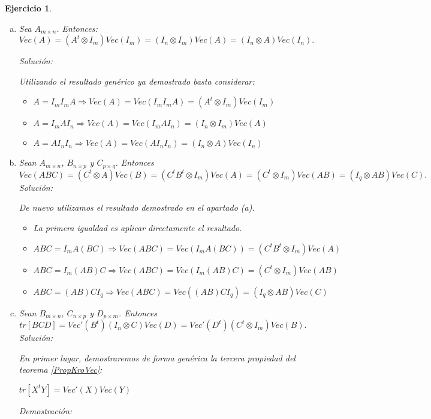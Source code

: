 \documentclass{article}
\theoremstyle{theorem-style}  %
\theoremstyle{definition-style}
\theoremstyle{example-style}
\theoremstyle{exercise-style}
\newtheorem{exercise}{Ejercicio}[section]
\begin{document}
\begin{exercise}
\begin{enumerate}[a)]
			\item Sea $A_{m \times n}$. Entonces:
			$$Vec(A) = (A^t \otimes I_m)Vec(I_m) = (I_n \otimes I_m)Vec(A) = (I_n \otimes A)Vec(I_n).$$
			
			\textit{Solución:}
			
			Utilizando el resultado genérico ya demostrado basta considerar:
			\begin{itemize}
				\item $A = I_mI_mA \Rightarrow Vec(A)=Vec(I_mI_mA)=(A^t\otimes I_m)Vec(I_m)$
				\item $A = I_mAI_n \Rightarrow Vec(A)=Vec(I_mAI_n)=(I_n\otimes I_m)Vec(A)$
				\item $A = AI_nI_n \Rightarrow Vec(A)=Vec(AI_nI_n)=(I_n\otimes A)Vec(I_n)$
			\end{itemize}
			
			\item Sean $A_{m \times n}$, $B_{n \times p}$ y $C_{p \times q}$. Entonces
			$$Vec(ABC) = (C^t \otimes A)Vec(B) = (C^tB^t \otimes I_m)Vec(A) = (C^t\otimes I_m)Vec(AB) = (I_q \otimes AB)Vec(C).$$
			\textit{Solución:}
			
			De nuevo utilizamos el resultado demostrado en el apartado (a).
			\begin{itemize}
				\item La primera igualdad es aplicar directamente el resultado.
				
				\item $ABC = I_mA(BC) \Rightarrow Vec(ABC) = Vec(I_mA(BC)) = (C^tB^t \otimes I_m)Vec(A)$
				\item $ABC=I_m(AB)C \Rightarrow Vec(ABC) = Vec(I_m(AB)C) = (C^t \otimes I_m)Vec(AB)$
				\item $ABC=(AB)CI_q \Rightarrow Vec(ABC) = Vec((AB)CI_q) = (I_q \otimes AB)Vec(C)$
			\end{itemize}
			
			
			\item Sean $B_{m \times n}$, $C_{n \times p}$ y $D_{p \times m}$. Entonces
			$$tr[BCD] = Vec'(B^t)(I_n\otimes C)Vec(D) = Vec'(D^t)(C^t \otimes I_m)Vec(B).$$
			\textit{Solución:}
			
			En primer lugar, demostraremos de forma genérica la tercera propiedad del teorema \ref{PropKroVec}:
			
			\textit{$tr[X^tY]=Vec'(X)Vec(Y)$}
			
			\textit{Demostración:}
			

\end{enumerate}
\end{exercise}
\end{document}
